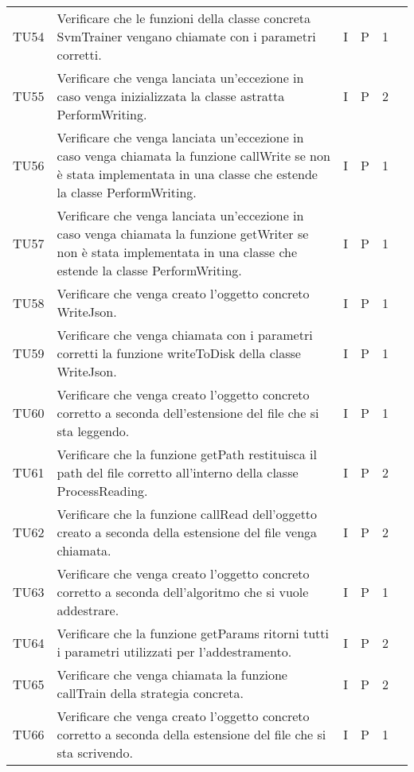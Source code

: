 \begin{longtable} {
		>{}p{12mm}
		>{}p{79.5mm}
		>{}p{9mm}
		>{}p{8mm}
		>{}p{14mm}
		>{}p{0mm}}
	TU54		& Verificare che le funzioni della classe concreta SvmTrainer vengano chiamate con i parametri corretti. & I & P & 1 & \TBstrut \\ [2mm]
	TU55		& Verificare che venga lanciata un'eccezione in caso venga inizializzata la classe astratta PerformWriting. & I & P & 2 & \TBstrut \\ [2mm]
	TU56		& Verificare che venga lanciata un'eccezione in caso venga chiamata la funzione callWrite se non è stata implementata in una classe che estende la classe PerformWriting. & I & P & 1 & \TBstrut \\ [2mm]
	TU57		& Verificare che venga lanciata un'eccezione in caso venga chiamata la funzione getWriter se non è stata implementata in una classe che estende la classe PerformWriting. & I & P & 1 & \TBstrut \\ [2mm]
	TU58		& Verificare che venga creato l'oggetto concreto WriteJson. & I & P & 1 & \TBstrut \\ [2mm]
	TU59		& Verificare che venga chiamata con i parametri corretti la funzione writeToDisk della classe WriteJson. & I & P & 1 & \TBstrut \\ [2mm]
	TU60		& Verificare che venga creato l'oggetto concreto corretto a seconda dell'estensione del file che si sta leggendo. & I & P & 1 & \TBstrut \\ [2mm]
	TU61		& Verificare che la funzione getPath restituisca il path del file corretto all'interno della classe ProcessReading. & I & P & 2 & \TBstrut \\ [2mm]
	TU62		& Verificare che la funzione callRead dell'oggetto creato a seconda della estensione del file venga chiamata. & I & P & 2 & \TBstrut \\ [2mm]
	TU63		& Verificare che venga creato l'oggetto concreto corretto a seconda dell'algoritmo che si vuole addestrare. & I & P & 1 & \TBstrut \\ [2mm]
	TU64		& Verificare che la funzione getParams ritorni tutti i parametri utilizzati per l'addestramento. & I & P & 2 & \TBstrut \\ [2mm]
	TU65		& Verificare che venga chiamata la funzione callTrain della strategia concreta. & I & P & 2 & \TBstrut \\ [2mm]
	TU66		& Verificare che venga creato l'oggetto concreto corretto a seconda della estensione del file che si sta scrivendo. & I & P & 1 & \TBstrut \\ [2mm]

\end{longtable}
